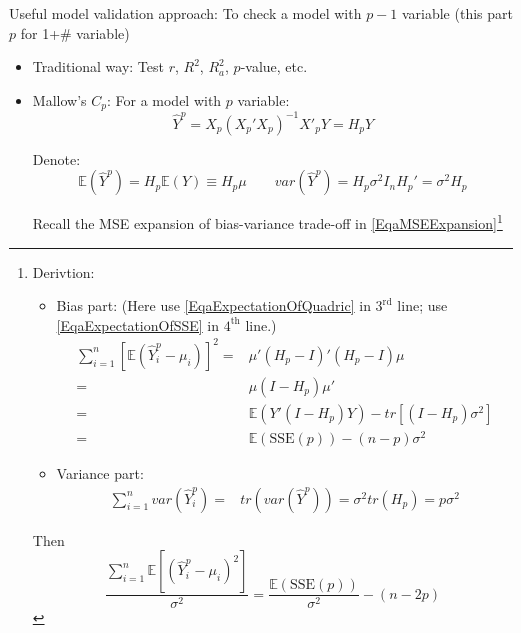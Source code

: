      Useful model validation approach: To check a model with $ p-1 $ variable (this part $ p $ for 1+\# variable)
        \begin{itemize}[topsep=2pt,itemsep=2pt]
        \item Traditional way: Test $ r $, $ R^2 $, $ R_a^2 $, $ p $-value, etc.
        \item Mallow's $ C_p $: For a model with $ p $ variable: 
        \begin{equation}
            \hat{Y}^p=X_p(X_p'X_p)^{-1}X'_pY=H_pY 
        \end{equation}
        
        Denote:
        \begin{equation}
            \mathbb{E}(\hat{Y}^p)=H_p\mathbb{E}(Y)\equiv H_p\mu \qquad var(\hat{Y}^p)=H_p\sigma ^2I_nH_p'=\sigma ^2H_p
        \end{equation}

        Recall the MSE expansion of bias-variance trade-off in \autoref{EqaMSEExpansion}\footnote{Derivtion:
        \begin{itemize}[topsep=2pt,itemsep=0pt]
            \item Bias part: (Here use \autoref{EqaExpectationOfQuadric} in $ 3^\mathrm{rd} $ line; use \autoref{EqaExpectationOfSSE} in $ 4^\mathrm{th} $ line.)
            \begin{align}
                \sum_{i=1}^n[\mathbb{E}(\hat{Y}_i^p-\mu _i)]^2=&\mu'(H_p-I)'(H_p-I)\mu\\
                =&\mu (I-H_p)\mu '\\
                =&\mathbb{E}(Y'(I-H_p)Y)-tr[(I-H_p)\sigma ^2]\\
                =&\mathbb{E}(\mathrm{SSE}(p))-(n-p)\sigma ^2
            \end{align}
            \item Variance part:
            \begin{align}
                \sum_{i=1}^nvar(\hat{Y}_i^p)=& tr(var(\hat{Y}^p))=\sigma ^2tr(H_p)=p\sigma ^2
            \end{align}
        \end{itemize}

        Then
        \begin{equation}
             \dfrac{\sum_{i=1}^n \mathbb{E}[(\hat{Y}_i^p-\mu_i)^2]}{\sigma ^2}=\dfrac{\mathbb{E}(\mathrm{SSE}(p) )}{\sigma ^2}-(n-2p)
        \end{equation}
            }


\end{itemize}
